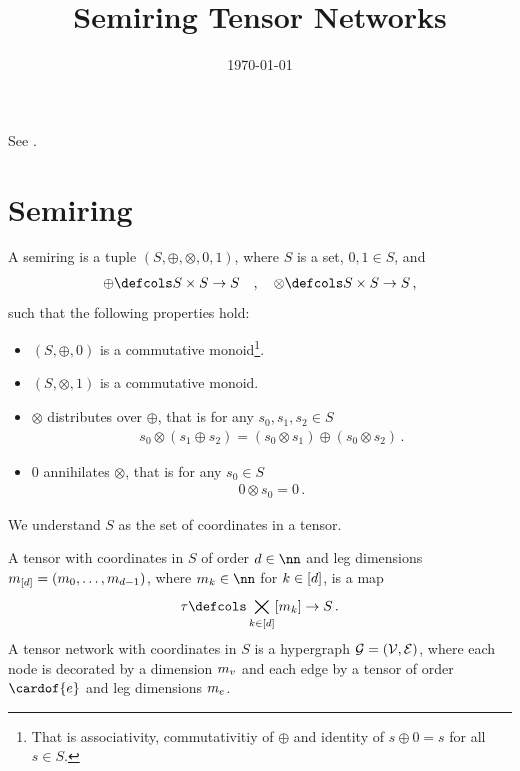 \documentclass[aps,onecolumn,nofootinbib,pra]{article}
\newcommand{\gensemiring}{(S,\srplus,\srmul,0,1)}
\newcommand{\srplus}{\oplus}
\newcommand{\srmul}{\otimes} %
\begin{document}
    \title{Semiring Tensor Networks}

    \maketitle
    \date{\today}

    See \cite{liu_computing_2023,liu_tropical_2021}.


    \section{Semiring}

    \begin{definition}
        A semiring is a tuple $\gensemiring$, where $S$ is a set, $0,1\in S$, and
        \begin{align*}
            \srplus \defcols S \times S \rightarrow S \quad, \quad \srmul \defcols S \times S \rightarrow S \, ,
        \end{align*}
        such that the following properties hold:
        \begin{itemize}
            \item[(i)] $(S,\srplus,0)$ is a commutative monoid\footnote{That is associativity, commutativitiy of $\srplus$ and identity of $s\srplus 0=s$ for all $s\in S$.}.
            \item[(ii)] $(S,\srmul,1)$ is a commutative monoid.
            \item[(iii)] $\srmul$ distributes over $\srplus$, that is for any $s_0,s_1,s_2\in S$
            \begin{align*}
                s_0 \srmul (s_1 \srplus s_2)
                = (s_0 \srmul s_1) \srplus (s_0 \srmul s_2) \, .
            \end{align*}
            \item[(iv)] $0$ annihilates $\srmul$, that is for any $s_0\in S$
            \begin{align*}
                0 \srmul s_0 = 0 \, .
            \end{align*}
        \end{itemize}
    \end{definition}

    We understand $S$ as the set of coordinates in a tensor.

    \begin{definition}
        A tensor with coordinates in $S$ of order $\catorder\in\nn$ and leg dimensions $m_{[d]}=(m_{0},\ldots,m_{d-1})$, where $\catdimof{\catenumerator}\in\nn$ for $k\in[d]$, is a map
        \begin{align*}
            \hypercore \defcols \facstates \rightarrow S \, .
        \end{align*}
        A tensor network with coordinates in $S$ is a hypergraph $\mathcal{G}=(\mathcal{V},\mathcal{E})$, where each node is decorated by a dimension $m_{v}$ and each edge by a tensor of order $\cardof{\edge}$ and leg dimensions $m_{e}$.
    \end{definition}
\end{document}
